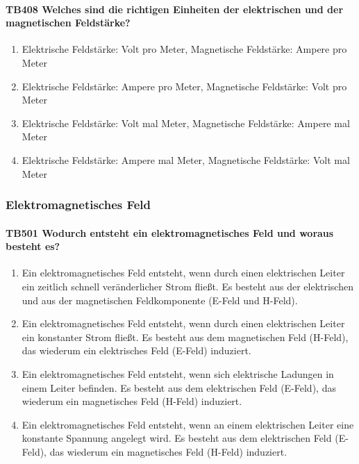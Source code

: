 \documentclass[8pt]{article}
\begin{document}
\begin{enumerate}
\paragraph*{TB408 Welches sind die richtigen Einheiten der elektrischen und der magnetischen Feldstärke?}
\begin{enumerate}[nolistsep,label=\Alph*]
\item Elektrische Feldstärke: Volt pro Meter, Magnetische Feldstärke: Ampere pro Meter
\item Elektrische Feldstärke: Ampere pro Meter, Magnetische Feldstärke: Volt pro Meter
\item Elektrische Feldstärke: Volt mal Meter, Magnetische Feldstärke: Ampere mal Meter
\item Elektrische Feldstärke: Ampere mal Meter, Magnetische Feldstärke: Volt mal Meter
\end{enumerate}


\pagebreak
\subsubsection{Elektromagnetisches Feld}

\paragraph*{TB501 Wodurch entsteht ein elektromagnetisches Feld und woraus besteht es?}
\begin{enumerate}[nolistsep,label=\Alph*]
\item Ein elektromagnetisches Feld entsteht, wenn durch einen elektrischen Leiter ein zeitlich schnell veränderlicher Strom fließt. Es besteht aus der elektrischen und aus der magnetischen Feldkomponente (E-Feld und H-Feld).
\item Ein elektromagnetisches Feld entsteht, wenn durch einen elektrischen Leiter ein konstanter Strom fließt. Es besteht aus dem magnetischen Feld (H-Feld), das wiederum ein elektrisches Feld (E-Feld) induziert.
\item Ein elektromagnetisches Feld entsteht, wenn sich elektrische Ladungen in einem Leiter befinden. Es besteht aus dem elektrischen Feld (E-Feld), das wiederum ein magnetisches Feld (H-Feld) induziert.
\item Ein elektromagnetisches Feld entsteht, wenn an einem elektrischen Leiter eine konstante Spannung angelegt wird. Es besteht aus dem elektrischen Feld (E-Feld), das wiederum ein magnetisches Feld (H-Feld) induziert.
\end{enumerate}




\end{enumerate}
\end{document}
